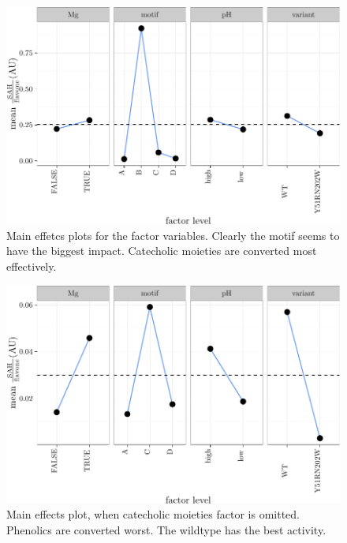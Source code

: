 \documentclass[]{tufte-handout}
\begin{document}
\begin{figure}
 \includegraphics{tufte_files/figure-latex/MEP-1.pdf}
\caption{Main effetcs plots for the factor variables. Clearly the motif seems to have the biggest impact. Catecholic moieties are converted most effectively.}
\end{figure}\begin{figure}
 \includegraphics{tufte_files/figure-latex/MEP-2.pdf}
\caption{Main effects plot, when catecholic moieties factor is omitted. Phenolics are converted worst. The wildtype has the best activity.}
\end{figure}
\end{document}
